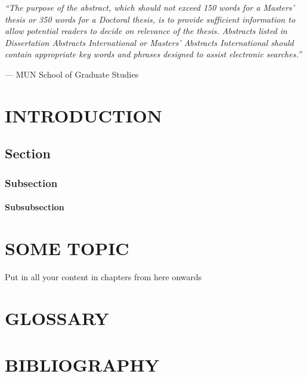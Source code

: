 \documentclass[english,a4paper,11pt]{report}
\begin{document}
	\vspace{1cm}
	
	\emph{``The purpose of the abstract, which should not exceed 150 words for
		a Masters' thesis or 350 words for a Doctoral thesis, is to provide
		sufficient information to allow potential readers to decide on relevance
		of the thesis. Abstracts listed in Dissertation Abstracts International
		or Masters' Abstracts International should contain appropriate key
		words and phrases designed to assist electronic searches.''}
	
	\hfill --- MUN School of Graduate Studies
	
	\newpage
	
	\chapter{\MakeUppercase{Introduction}}
	\section{Section}
	\subsection{Subsection}
	\subsubsection{Subsubsection}

	
	\chapter{\MakeUppercase{Some Topic}}

	Put in all your content in chapters from here onwards

	\chapter*{\MakeUppercase{Glossary}}

	\chapter*{\MakeUppercase{Bibliography}}
	
\end{document}

